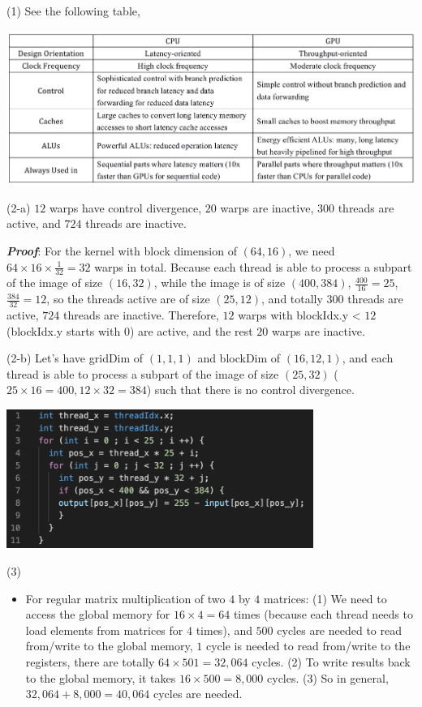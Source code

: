\documentclass[11pt]{article}
\begin{document}
\begin{solution}
(1) See the following table,
\begin{center}
\includegraphics[width=15cm]{cpugpu.png}
\end{center}
\item(2-a) $12$ warps have control divergence, $20$ warps are inactive, $300$ threads are active, and $724$ threads are inactive.
\item \textbf{\textit{Proof}}: For the kernel with block dimension of $(64, 16)$, we need $64 \times 16 \times \frac{1}{32} = 32$ warps in total. Because each thread is able to process a subpart of the image of size $(16, 32)$, while the image is of size $(400, 384)$, $\frac{400}{16} = 25$, $\frac{384}{32} = 12$, so the threads active are of size $(25, 12)$, and totally $300$ threads are active, $724$ threads are inactive. Therefore, $12$ warps with blockIdx.y < $12$ (blockIdx.y starts with $0$) are active, and the rest $20$ warps are inactive.
\item (2-b) Let's have gridDim of $(1, 1, 1)$ and blockDim of $(16, 12, 1)$, and each thread is able to process a subpart of the image of size $(25, 32)$ ($25 \times 16 = 400, 12 \times 32 = 384$) such that there is no control divergence.
\begin{center}
\includegraphics[width=10cm]{2.png}
\end{center}
\item (3) 
\begin{itemize}
\item For regular matrix multiplication of two $4$ by $4$ matrices: (1) We need to access the global memory for $16 \times 4 = 64$ times (because each thread needs to load elements from matrices for $4$ times), and $500$ cycles are needed to read from/write to the global memory, $1$ cycle is needed to read from/write to the registers, there are totally $64 \times 501 = 32,064$ cycles. (2) To write results back to the global memory, it takes $16 \times 500 = 8,000$ cycles. (3) So in general, $32,064 + 8,000 = 40,064$ cycles are needed.

\end{itemize}
\end{solution}
\end{document}
